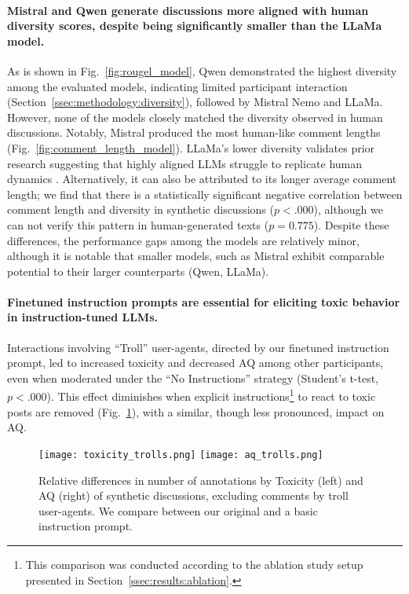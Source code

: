 \paragraph{Mistral and Qwen generate discussions more aligned with human diversity scores, despite being significantly smaller than the LLaMa model.} As is shown in Fig.~\ref{fig:rougel_model}, Qwen demonstrated the highest diversity among the evaluated models, indicating limited participant interaction (Section~\ref{ssec:methodology:diversity}), followed by Mistral Nemo and LLaMa. However, none of the models closely matched the diversity observed in human discussions. Notably, Mistral produced the most human-like comment lengths (Fig.~\ref{fig:comment_length_model}). LLaMa's lower diversity validates prior research suggesting that highly aligned \acp{LLM} struggle to replicate human  dynamics \cite{Park2023GenerativeAI, leng_2024}. Alternatively, it can also be attributed to its longer average comment length; we find that there is a statistically significant negative correlation between comment length and diversity in synthetic discussions ($p < .000$), although we can not verify this pattern in human-generated texts ($p = 0.775$). Despite these differences, the performance gaps among the models are relatively minor, although it is notable that smaller models, such as Mistral exhibit comparable potential to their larger counterparts (Qwen, LLaMa).

\paragraph{Finetuned instruction prompts are essential for eliciting toxic behavior in instruction-tuned \acp{LLM}.} Interactions involving “Troll” user-agents, directed by our finetuned instruction prompt, led to increased toxicity and decreased \ac{AQ} among other participants, even when moderated under the “No Instructions” strategy (Student's t-test, $p < .000$). This effect diminishes when explicit instructions\footnote{This comparison was conducted according to the ablation study setup presented in Section~\ref{ssec:results:ablation}.} to react to toxic posts are removed (Fig.~\ref{fig:boxplots}), with a similar, though less pronounced, impact on \ac{AQ}.

\begin{figure}[t]
    \centering
    \texttt{[image: toxicity\_trolls.png]} \hfill
    \texttt{[image: aq\_trolls.png]}
    \caption{Relative differences in number of annotations by Toxicity (left) and \ac{AQ} (right) of synthetic discussions, excluding comments by troll user-agents. We compare between our original and a basic instruction prompt.}
    \label{fig:boxplots}
\end{figure}


